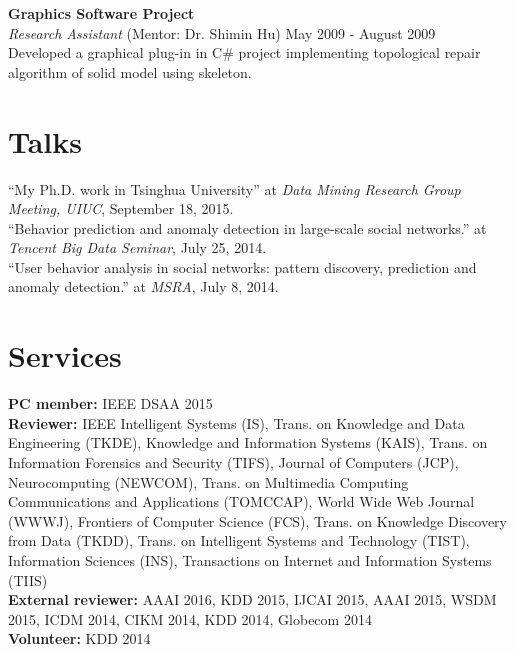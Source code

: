 \documentclass[margin, 10pt]{res} %
\begin{document}
\begin{resume}
{\bf Graphics Software Project} \\
{\em Research Assistant} (Mentor: Dr. Shimin Hu) \hfill {May 2009 - August 2009} \\
Developed a graphical plug-in in C\# project implementing topological repair algorithm of solid model using skeleton.




\section{Talks}

``My Ph.D. work in Tsinghua University'' at {\em Data Mining Research Group Meeting, UIUC}, September 18, 2015. \\
``Behavior prediction and anomaly detection in large-scale social networks.'' at {\em Tencent Big Data Seminar}, July 25, 2014. \\
``User behavior analysis in social networks: pattern discovery, prediction and anomaly detection.'' at {\em MSRA}, July 8, 2014.


\section{Services}

{\bf PC member:} IEEE DSAA 2015 \\
{\bf Reviewer:} IEEE Intelligent Systems (IS), Trans. on Knowledge and Data Engineering (TKDE), 
Knowledge and Information Systems (KAIS), Trans. on Information Forensics and Security (TIFS), Journal of Computers (JCP), Neurocomputing (NEWCOM),
Trans. on Multimedia Computing Communications and Applications (TOMCCAP), World Wide Web Journal (WWWJ), Frontiers of Computer Science (FCS),
Trans. on Knowledge Discovery from Data (TKDD), Trans. on Intelligent Systems and Technology (TIST), Information Sciences (INS),
Transactions on Internet and Information Systems (TIIS) \\
{\bf External reviewer:} AAAI 2016, KDD 2015, IJCAI 2015, AAAI 2015, WSDM 2015, ICDM 2014, CIKM 2014, KDD 2014, Globecom 2014 \\
{\bf Volunteer:} KDD 2014


\end{resume}
\end{document}
